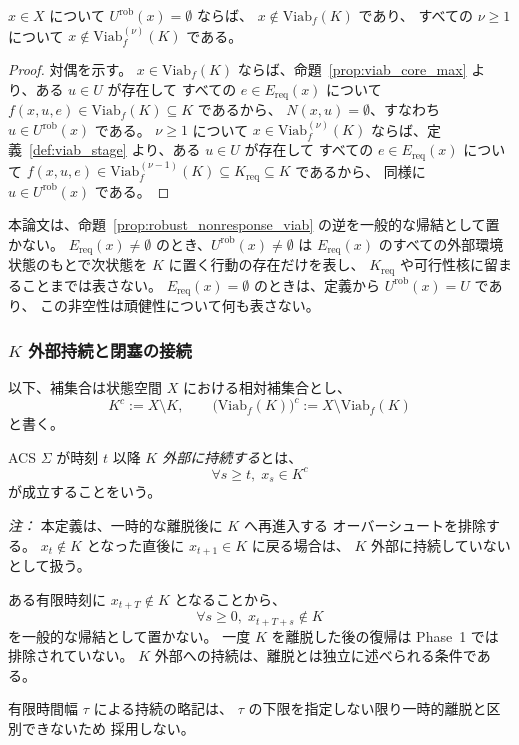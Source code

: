\begin{proposition}[頑健応答不能と頑健可行集合]
\label{prop:robust_nonresponse_viab}
$x\in X$ について $U^{\mathrm{rob}}(x)=\emptyset$ ならば、
$x\notin\mathrm{Viab}_f(K)$ であり、
すべての $\nu\ge1$ について $x\notin\mathrm{Viab}_f^{(\nu)}(K)$ である。
\end{proposition}

\begin{proof}
対偶を示す。
$x\in\mathrm{Viab}_f(K)$ ならば、命題~\ref{prop:viab_core_max} より、ある $u\in U$ が存在して
すべての $e\in E_{\mathrm{req}}(x)$ について $f(x,u,e)\in\mathrm{Viab}_f(K)\subseteq K$ であるから、
$N(x,u)=\emptyset$、すなわち $u\in U^{\mathrm{rob}}(x)$ である。
$\nu\ge1$ について $x\in\mathrm{Viab}_f^{(\nu)}(K)$ ならば、定義~\ref{def:viab_stage} より、ある $u\in U$ が存在して
すべての $e\in E_{\mathrm{req}}(x)$ について
$f(x,u,e)\in\mathrm{Viab}_f^{(\nu-1)}(K)\subseteq K_{\mathrm{req}}\subseteq K$ であるから、
同様に $u\in U^{\mathrm{rob}}(x)$ である。
\end{proof}

本論文は、命題~\ref{prop:robust_nonresponse_viab} の逆を一般的な帰結として置かない。
$E_{\mathrm{req}}(x)\neq\emptyset$ のとき、$U^{\mathrm{rob}}(x)\neq\emptyset$ は
$E_{\mathrm{req}}(x)$ のすべての外部環境状態のもとで次状態を $K$ に置く行動の存在だけを表し、
$K_{\mathrm{req}}$ や可行性核に留まることまでは表さない。
$E_{\mathrm{req}}(x)=\emptyset$ のときは、定義から $U^{\mathrm{rob}}(x)=U$ であり、
この非空性は頑健性について何も表さない。

\subsubsection{$K$ 外部持続と閉塞の接続}

\begin{definition}[$K$ 外部持続]
\label{def:theta_exterior}
以下、補集合は状態空間 $X$ における相対補集合とし、
\[
  K^c:=X\setminus K,
  \qquad
  \bigl(\mathrm{Viab}_f(K)\bigr)^c
  :=
  X\setminus\mathrm{Viab}_f(K)
\]
と書く。

ACS $\Sigma$ が時刻 $t$ 以降
\emph{$K$ 外部に持続する}とは、
\[
  \forall s\ge t,\;
  x_s\in K^c
\]
が成立することをいう。

\textit{注：}
本定義は、一時的な離脱後に $K$ へ再進入する
オーバーシュートを排除する。
$x_t\notin K$ となった直後に $x_{t+1}\in K$ に戻る場合は、
$K$ 外部に持続していないとして扱う。

ある有限時刻に $x_{t+T}\notin K$ となることから、
\[
  \forall s\ge0,\;
  x_{t+T+s}\notin K
\]
を一般的な帰結として置かない。
一度 $K$ を離脱した後の復帰は Phase~1 では排除されていない。
$K$ 外部への持続は、離脱とは独立に述べられる条件である。

有限時間幅 $\tau$ による持続の略記は、
$\tau$ の下限を指定しない限り一時的離脱と区別できないため
採用しない。
\end{definition}

